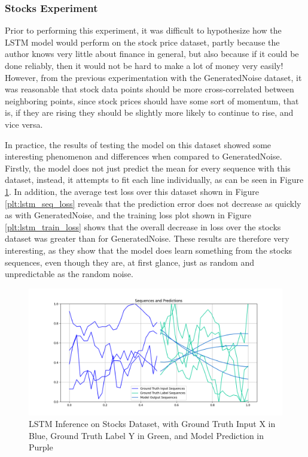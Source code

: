 \documentclass{scrartcl}
\begin{document}
\subsubsection{Stocks Experiment}
\label{subsubsec:stocks}

Prior to performing this experiment, it was difficult to hypothesize how the
LSTM model would perform on the stock price dataset, partly because the author
knows very little about finance in general, but also because if it could be
done reliably, then it would not be hard to make a lot of money very easily!
However, from the previous experimentation with the GeneratedNoise dataset, it
was reasonable that stock data points should be more cross-correlated between
neighboring points, since stock prices should have some sort of momentum, that
is, if they are rising they should be slightly more likely to continue to rise,
and vice versa. 

In practice, the results of testing the model on this dataset showed some
interesting phenomenon and differences when compared to GeneratedNoise.
Firstly, the model does not just predict the mean for every sequence with this
dataset, instead, it attempts to fit each line individually, as can be seen in
Figure \ref{inf:lstm_stocks_inference}. In addition, the average test loss over
this dataset shown in Figure \ref{plt:lstm_seq_loss} reveals that the
prediction error does not decrease as quickly as with GeneratedNoise, and the
training loss plot shown in Figure \ref{plt:lstm_train_loss} shows that the
overall decrease in loss over the stocks dataset was greater than for
GeneratedNoise. These results are therefore very interesting, as they show that
the model does learn something from the stocks sequences, even though they are,
at first glance, just as random and unpredictable as the random noise.

\begin{figure}[H]
	\centering
	\includegraphics[width=1\textwidth]{inferences/stocks/3layer_s31.png}
	\caption{LSTM Inference on Stocks Dataset, with Ground Truth Input X in Blue, Ground Truth Label Y in Green, and Model Prediction in Purple}
	\label{inf:lstm_stocks_inference}
\end{figure}
\end{document}
